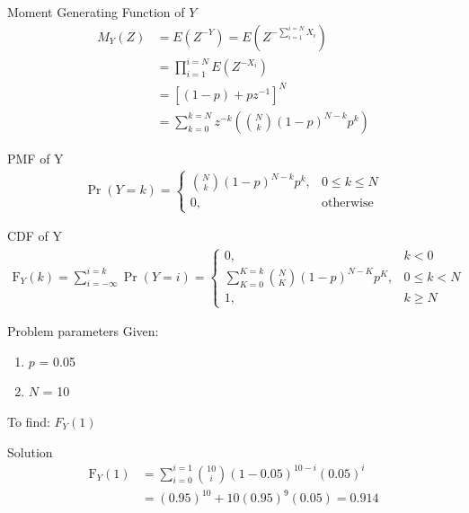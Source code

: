 \documentclass{beamer}
\providecommand{\pr}[1]{\ensuremath{\Pr\left(#1\right)}}
\providecommand{\cdf}[2]{\ensuremath{\text{F}_{#1}\left(#2\right)}}
\begin{document}
\begin{frame}
	\begin{exampleblock}{Moment Generating Function of $Y$}
		\begin{align}
			M_Y(Z) &= E(Z^{-Y}) = E(Z^{-\sum_{i = 1}^{i = N}X_i}) \\
			&= \prod_{i = 1}^{i = N}E(Z^{-X_i}) \\		
			&= [(1 - p) + pz^{-1}]^N \\
			&= \sum_{k = 0}^{k = N}z^{-k}(\binom{N}{k}(1 - p)^{N - k}p^k)
			\label{mgf-Y}		
		\end{align}
	\end{exampleblock}
	\begin{alertblock}{PMF of Y}
		\begin{align}
			\pr{Y = k} = 
			\begin{cases}
			\binom{N}{k}(1 - p)^{N - k}p^k, & 0 \leq k \leq N \\
			0, & \textrm{otherwise}
			\end{cases}
			\label{pmf-Y}		
		\end{align}
	\end{alertblock}
\end{frame}

\begin{frame}
	\begin{alertblock}{CDF of Y}
		\begin{align}
			\cdf{Y}{k} = \sum_{i = -\infty}^{i = k}\pr{Y = i} =
			\begin{cases}
			0, & k < 0 \\
			\sum_{K = 0}^{K = k}\binom{N}{K}(1 - p)^{N - K}p^K, & 0 \leq k < N \\
			1, & k \geq N
			\end{cases}
			\label{cdf-Y}		
		\end{align}
	\end{alertblock}
	\begin{alertblock}{Problem parameters}
		Given:
    		\begin{enumerate}
    			\item $p$ = 0.05
    			\item $N$ = 10
    		\end{enumerate}
		To find: $F_Y(1)$    
    \end{alertblock}
\end{frame}

\begin{frame}{Solution}
	\begin{align}
		\cdf{Y}{1} &= \sum_{i = 0}^{i = 1}\binom{10}{i}(1 - 0.05)^{10 - i}(0.05)^i \\
		&= (0.95)^{10} + 10(0.95)^9(0.05) = 0.914
	\end{align}
\end{frame}
\end{document}
